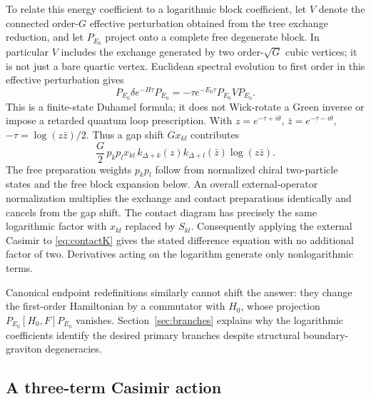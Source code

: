 \documentclass[11pt,a4paper]{article}
\numberwithin{equation}{section}
\theoremstyle{remark}\newtheorem{remark}[theorem]{Remark}
\begin{document}
To relate this energy coefficient to a logarithmic block coefficient, let $V$ denote the connected order-$G$ effective perturbation obtained from the tree exchange reduction, and let $P_{E_0}$ project onto a complete free degenerate block. In particular $V$ includes the exchange generated by two order-$\sqrt G$ cubic vertices; it is not just a bare quartic vertex. Euclidean spectral evolution to first order in this effective perturbation gives
\begin{equation}
 P_{E_0}\delta e^{-H\tau}P_{E_0}
 =-\tau e^{-E_0\tau}P_{E_0}VP_{E_0}.
 \label{eq:duhamel}
\end{equation}
This is a finite-state Duhamel formula; it does not Wick-rotate a Green inverse or impose a retarded quantum loop prescription. With $z=e^{-\tau+i\theta}$, $\bar z=e^{-\tau-i\theta}$,
$-\tau=\log(z\bar z)/2$. Thus a gap shift $Gx_{kl}$ contributes
\begin{equation}
 \frac G2\,p_kp_l x_{kl}\,
 k_{\Delta+k}(z)k_{\Delta+l}(\bar z)\log(z\bar z).
 \label{eq:logfactor}
\end{equation}
The free preparation weights $p_kp_l$ follow from normalized chiral two-particle states and the free block expansion below. An overall external-operator normalization multiplies the exchange and contact preparations identically and cancels from the gap shift. The contact diagram has precisely the same logarithmic factor with $x_{kl}$ replaced by $S_{kl}$. Consequently applying the external Casimir to \eqref{eq:contactK} gives the stated difference equation with no additional factor of two. Derivatives acting on the logarithm generate only nonlogarithmic terms.

Canonical endpoint redefinitions similarly cannot shift the answer: they change the first-order Hamiltonian by a commutator with $H_0$, whose projection $P_{E_0}[H_0,F]P_{E_0}$ vanishes. Section~\ref{sec:branches} explains why the logarithmic coefficients identify the desired primary branches despite structural boundary-graviton degeneracies.

\subsection{A three-term Casimir action}
\end{document}
